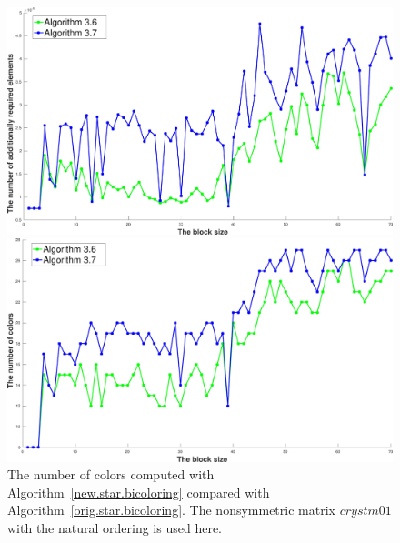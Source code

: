 \documentclass[12pt, twoside,a4paper,toc=bibliography]{scrbook}
\newcommand{\coderef}[1]{Algorithm~\protect\ref{#1}}
\begin{document}
\begin{figure}
\includegraphics[width=0.9\linewidth]{crystm01_alg36_bls_nat_adds}
\caption{The number of additionally required elements computed with
\coderef{new.star.bicoloring} compared with \coderef{orig.star.bicoloring}.
The nonsymmetric matrix \textit{$crystm01$} with the natural ordering is used here.}
\label{crystm01_alg36_bls_nat_adds}

\includegraphics[width=0.9\linewidth]{crystm01_alg36_bls_nat_cols}
\caption{The number of colors computed with
\coderef{new.star.bicoloring} compared with \coderef{orig.star.bicoloring}.
The nonsymmetric matrix \textit{$crystm01$} with the natural ordering is used here.}
\label{crystm01_alg36_bls_nat_cols}
\end{figure}


\end{document}
